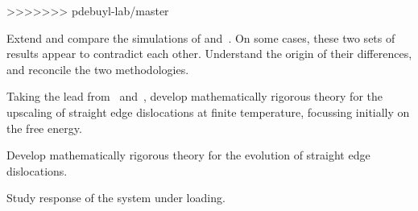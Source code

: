 \begin{workpackage}[id=WPkinetic,wphases=0-48,
short=Kin. control,
title=Kinetic control,
lead=TUE,
TUERM=24]
\begin{wpdescription}
>>>>>>> pdebuyl-lab/master
\end{wpdescription}


\begin{tasklist}


  \begin{task}[title=Reconcile the simulations]
  Extend and compare the simulations of \cite[Ch.~9]{VanMeurs15TH}
  and~\cite[Ch.~6]{Kooiman15TH}. On some cases, these two sets of results appear to
  contradict each other. Understand the origin of their differences, and reconcile the two
  methodologies.
  \end{task}

  \begin{task}[title=Upscaling the energy]
  Taking the lead from~\cite[Ch.~2]{Kooiman15TH} and~\cite{SandierSerfaty12TR}, develop
  mathematically rigorous theory for the upscaling of straight edge dislocations at finite
  temperature, focussing initially on the free energy.
  \end{task}
  
  \begin{task}[title=Upscaling the evolution]
  Develop mathematically rigorous theory for the evolution of straight edge dislocations.
  \end{task}
  
  \begin{task}[title=Response]
  Study response of the system under loading.
  \end{task}

\end{tasklist}


\end{workpackage}
